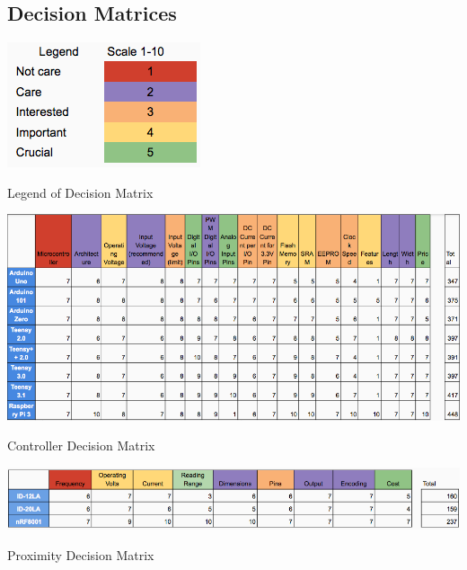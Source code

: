 \documentclass[12pt]{article}
\begin{document}
\newpage
\begin{appendix}

\section{Decision Matrices} \label{App:DecisionMatrices}

  \begin{table}[!htb]
    \begin{center}
      \includegraphics[scale=1]{Figures/DecisionMatrixLegend}
    \end{center}
    \caption{Legend of Decision Matrix}
    \label{tabl:DecLegend}
  \end{table}

  \begin{table}[!htb]
    \includegraphics[width=\textwidth]{Figures/DecisionMatrixController}
    \caption{Controller Decision Matrix}
     \label{tabl:DecController}
  \end{table}

  \begin{table}[!htb]
    \includegraphics[width=\textwidth]{Figures/DecisionMatrixProximity}
    \caption{Proximity Decision Matrix}
     \label{tabl:DecProximity}
  \end{table}


\end{appendix}
\end{document}
